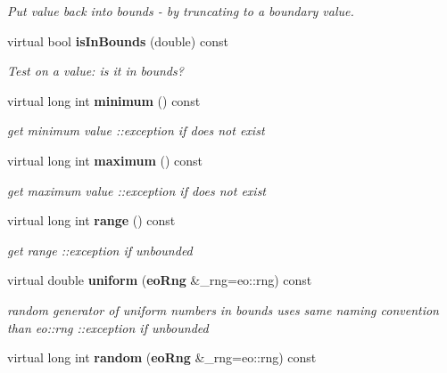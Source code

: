 \begin{CompactItemize}
\begin{CompactList}\small\item\em Put value back into bounds - by truncating to a boundary value. \item\end{CompactList}\item 
virtual bool {\bf is\-In\-Bounds} (double) const \label{classeo_int_no_bounds_a7}

\begin{CompactList}\small\item\em Test on a value: is it in bounds? \item\end{CompactList}\item 
virtual long int {\bf minimum} () const \label{classeo_int_no_bounds_a8}

\begin{CompactList}\small\item\em get minimum value ::exception if does not exist \item\end{CompactList}\item 
virtual long int {\bf maximum} () const \label{classeo_int_no_bounds_a9}

\begin{CompactList}\small\item\em get maximum value ::exception if does not exist \item\end{CompactList}\item 
virtual long int {\bf range} () const \label{classeo_int_no_bounds_a10}

\begin{CompactList}\small\item\em get range ::exception if unbounded \item\end{CompactList}\item 
virtual double {\bf uniform} ({\bf eo\-Rng} \&\_\-rng=eo::rng) const \label{classeo_int_no_bounds_a11}

\begin{CompactList}\small\item\em random generator of uniform numbers in bounds uses same naming convention than eo::rng ::exception if unbounded \item\end{CompactList}\item 
virtual long int {\bf random} ({\bf eo\-Rng} \&\_\-rng=eo::rng) const \label{classeo_int_no_bounds_a12}


\end{CompactItemize}
